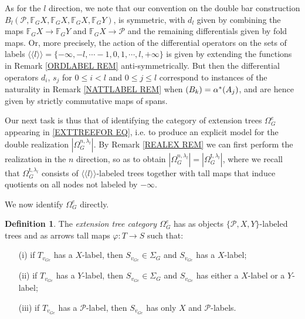 \documentclass[a4paper,10pt
,draft
]{article}%
\numberwithin{equation}{section}
\numberwithin{figure}{section}
\theoremstyle{definition} %
\newtheorem{definition}[equation]{Definition}%
\newcommand{\1}{\ensuremath{\mathbbm 1}}%
\begin{document}
As for the $l$ direction, we note that our convention on 
the double bar construction 
$B_l(\mathcal{P}, \mathbb{F}_G X, \mathbb{F}_G X, \mathbb{F}_G X, \mathbb{F}_G Y)$,
is symmetric, 
with $d_l$ given by combining the maps
$\mathbb{F}_G X \to \mathbb{F}_G Y$ 
and 
$\mathbb{F}_G X \to \mathcal{P}$
and the remaining differentials given by fold maps.
Or, more precisely, the action of the differential operators
on the sets of labels
$\langle \langle l \rangle \rangle = 
\{-\infty,-l, \cdots -1,0,1,\cdots,l,+\infty\}$
is given by extending the functions in 
Remark \ref{ORDLABEL REM} anti-symmetrically.
But then the differential operators 
$d_i$, $s_j$ for $0\leq i<l$ and $0\leq j \leq l$
correspond to instances of the naturality in 
Remark \ref{NATTLABEL REM}
when $(B_k) =\alpha^{\**}(A_j)$,
and are hence given by strictly commutative maps of spans.

Our next task is thus that of identifying the category of extension trees $\Omega_G^e$ appearing
in \eqref{EXTTREEFOR EQ},
i.e. to produce an explicit model for the double realization
$|\Omega_G^{n,\lambda_l}|$.
By Remark \ref{REALEX REM}
we can first perform the realization in the $n$ direction, so as to obtain
$|\Omega_G^{n,\lambda_l}|=|\Omega_G^{\mathsf{t},\lambda_l}|$,
where we recall that 
$\Omega_G^{\mathsf{t},\lambda_l}$
consists of $\langle \langle l \rangle \rangle$-labeled trees
together with tall maps that induce quotients on all nodes not labeled by $-\infty$.

We now identify $\Omega_G^{e}$ directly.


\begin{definition}\label{EXTTREECAT DEF}
	The \textit{extension tree category $\Omega_G^e$}
	has as objects $\{\mathcal{P},X,Y\}$-labeled trees
	and as arrows tall maps $\varphi \colon T \to S$ such that:
	\begin{itemize}
		\item[(i)] if $T_{v_{Ge}}$ has a $X$-label, then 
		$S_{v_{Ge}} \in \Sigma_G$ and $S_{v_{Ge}}$ has a $X$-label;
		\item[(ii)] if $T_{v_{Ge}}$ has a $Y$-label, then 
		$S_{v_{Ge}} \in \Sigma_G$ and $S_{v_{Ge}}$ has either a $X$-label or a $Y$-label;
		\item[(iii)] if $T_{v_{Ge}}$ has a $\mathcal{P}$-label, then 
		$S_{v_{Ge}}$ has only $X$ and $\mathcal{P}$-labels.
	\end{itemize}
\end{definition}
\end{document}
